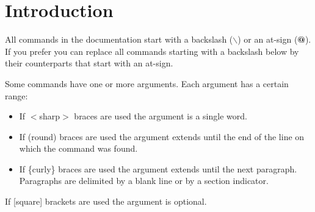 \hypertarget{commands_cmd_intro}{}\section{Introduction}\label{commands_cmd_intro}
All commands in the documentation start with a backslash ({\bf $\backslash$}) or an at-sign ({\bf @}). If you prefer you can replace all commands starting with a backslash below by their counterparts that start with an at-sign.

Some commands have one or more arguments. Each argument has a certain range: \begin{itemize}
\item If $<$sharp$>$ braces are used the argument is a single word. \item If (round) braces are used the argument extends until the end of the line on which the command was found. \item If \{curly\} braces are used the argument extends until the next paragraph. Paragraphs are delimited by a blank line or by a section indicator. \end{itemize}
If \mbox{[}square\mbox{]} brackets are used the argument is optional.

